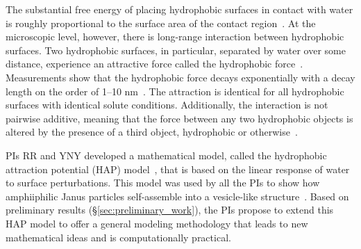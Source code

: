 The substantial free energy of placing hydrophobic surfaces in
contact with water is roughly proportional to the surface area of the
contact region~\cite{Bjorneholm2016}.
At the microscopic level, however, there is long-range interaction
between hydrophobic surfaces. Two hydrophobic surfaces, in particular,
separated by water over some distance, experience an attractive force
called the hydrophobic force~\cite{Lum1999, Meyer2006, Hammer2010}.
Measurements show that the hydrophobic force decays exponentially with a
decay length on the order of 1--10 nm~\cite{Israelachvili1984,
Marcelja1977,Christenson2001,Lin2005}. The attraction is identical for
all hydrophobic surfaces with identical solute conditions.
Additionally, the interaction is not pairwise additive, meaning that the
force between any two hydrophobic objects is altered by the presence of
a third object, hydrophobic or otherwise~\cite{SilveraBatista1242477}. 

PIs RR and YNY developed a mathematical model, called the hydrophobic
attraction potential (HAP) model~\cite{Fu2018_SIAM}, that is based on
the linear response of water to surface perturbations. This model was
used by all the PIs to show how amphiiphilic Janus particles
self-assemble into a vesicle-like structure~\cite{FuQuRyYo20}. Based on
preliminary results (\S\ref{sec:preliminary_work}), the PIs propose to
extend this HAP model to offer a general modeling methodology that leads
to new mathematical ideas and is computationally practical.

